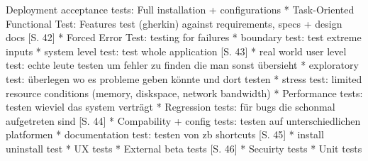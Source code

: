 \documentclass[a4paper,bibtotoc,oneside]{scrbook}
\begin{document}
Deployment acceptance tests:
Full installation + configurations
* Task-Oriented Functional Test: Features test (gherkin) against requirements, specs + design docs \cite{testing_apps_on_web}[S. 42]
* Forced Error Test: testing for failures 
* boundary test: test extreme inputs
* system level test: test whole application \cite{testing_apps_on_web}[S. 43]
* real world user level test: echte leute testen um fehler zu finden die man sonst übersieht
* exploratory test: überlegen wo es probleme geben könnte und dort testen
* stress test: limited resource conditions (memory, diskspace, network bandwidth)
* Performance tests: testen wieviel das system verträgt
* Regression tests: für bugs die schonmal aufgetreten sind \cite{testing_apps_on_web}[S. 44]
* Compability + config tests: testen auf unterschiedlichen platformen
* documentation test: testen von zb shortcuts \cite{testing_apps_on_web}[S. 45]
* install uninstall test
* UX tests
* External beta tests \cite{testing_apps_on_web}[S. 46]
* Secuirty tests
* Unit tests









\end{document}
